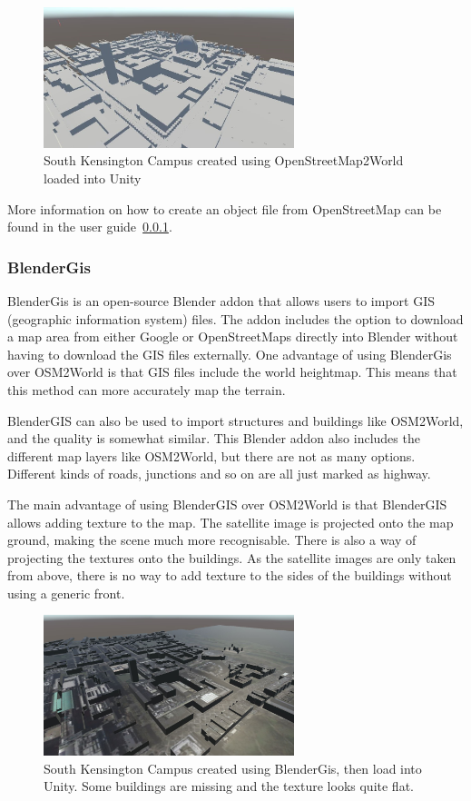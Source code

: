 \begin{figure}[H]
    \centering
    \includegraphics[width=0.65\textwidth]{06_Implementation/00_Maps/Images/OSM1Cropped.JPG}
    \caption[Map created using OpenStreetMap2World]{South Kensington Campus created using OpenStreetMap2World loaded into Unity}
\end{figure}

More information on how to create an object file from OpenStreetMap can be found in the user guide~\ref{}.
\subsubsection{BlenderGis}
BlenderGis is an open-source Blender addon that allows users to import GIS (geographic information system) files. The addon includes the option to download a map area from either Google or OpenStreetMaps directly into Blender without having to download the GIS files externally. One advantage of using BlenderGis over OSM2World is that GIS files include the world heightmap. This means that this method can more accurately map the terrain. 

BlenderGIS can also be used to import structures and buildings like OSM2World, and the quality is somewhat similar. This Blender addon also includes the different map layers like OSM2World, but there are not as many options. Different kinds of roads, junctions and so on are all just marked as highway. 

The main advantage of using BlenderGIS over OSM2World is that BlenderGIS allows adding texture to the map. The satellite image is projected onto the map ground, making the scene much more recognisable. There is also a way of projecting the textures onto the buildings. As the satellite images are only taken from above, there is no way to add texture to the sides of the buildings without using a generic front. 

\begin{figure}[H]
    \centering
    \includegraphics[width=0.65\textwidth]{06_Implementation/00_Maps/Images/BlenderGis1Cropped.JPG}
    \caption[Map created using BlenderGis]{South Kensington Campus created using BlenderGis, then load into Unity. Some buildings are missing and the texture looks quite flat.}
\end{figure}

